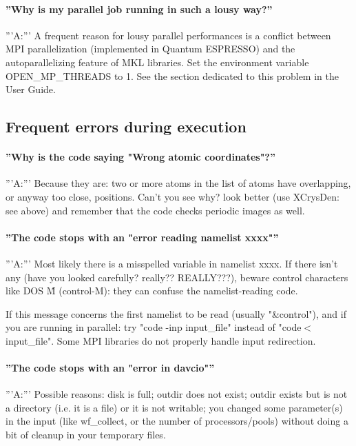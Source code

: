 \documentclass[12pt,a4paper]{article}
\def\qe{{\sc Quantum ESPRESSO}}
\begin{document}
\paragraph{''Why is my parallel job running in such a lousy way?''}
'''A:''' A frequent reason for lousy parallel performances is a
conflict between MPI parallelization (implemented in \qe)
and the autoparallelizing feature of MKL libraries. Set the
environment variable OPEN\_MP\_THREADS to 1. See the section 
dedicated to this problem in the User Guide.

\subsection{Frequent errors during execution}

\paragraph{ ''Why is the code saying "Wrong atomic coordinates"?''}
'''A:''' Because they are: two or more atoms in the list of atoms have
overlapping, or anyway too close, positions. Can't you see why? look better
(use XCrysDen: see above) and remember that the code checks periodic
images as well. 

\paragraph{ ''The code stops with an "error reading namelist xxxx"''}
'''A:''' Most likely there is a misspelled variable in namelist xxxx.
If there isn't any (have you looked carefully? really?? REALLY???), 
beware control characters like DOS \^M (control-M): they can confuse
the namelist-reading code. 

If this message concerns the first namelist to be read
(usually "\&control"), and if you are running 
in parallel: try "code -inp input\_file" instead of "code$<$ input\_file". 
Some MPI libraries do not properly handle input redirection.

\paragraph{ ''The code stops with an "error in davcio"''}
'''A:''' Possible reasons: disk is full; outdir does not exist; outdir
exists but is not a directory (i.e. it is a file) or it is not
writable; you changed some parameter(s) in the input (like wf\_collect,
or the number of processors/pools) without doing a bit of cleanup in
your temporary files. 
\end{document}
